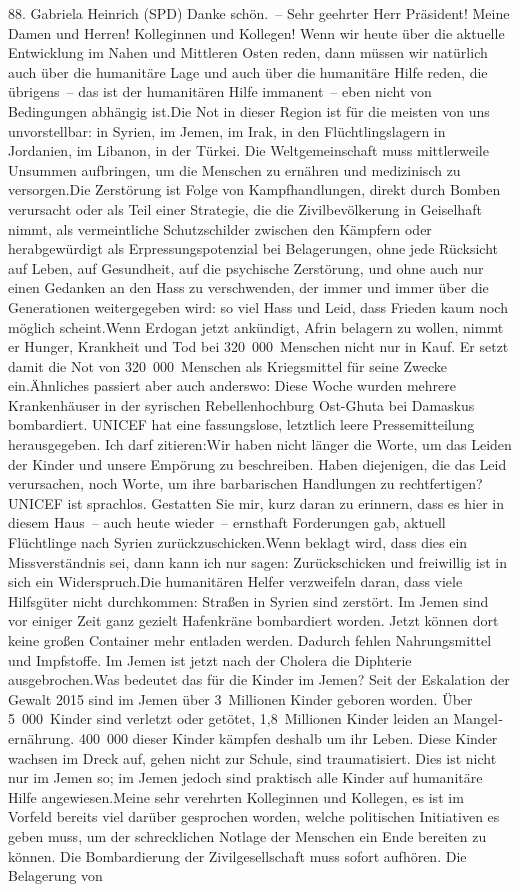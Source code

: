 \documentclass{article}
\begin{document}
	88. Gabriela Heinrich (SPD) Danke schön. – Sehr geehrter Herr Präsident! Meine Damen und Herren! Kolleginnen und Kollegen! Wenn wir heute über die aktuelle Entwicklung im Nahen und Mittleren Osten reden, dann müssen wir natürlich auch über die humanitäre Lage und auch über die humanitäre Hilfe reden, die übrigens – das ist der humanitären Hilfe immanent – eben nicht von Bedingungen abhängig ist.Die Not in dieser Region ist für die meisten von uns unvorstellbar: in Syrien, im Jemen, im Irak, in den Flüchtlingslagern in Jordanien, im Libanon, in der Türkei. Die Weltgemeinschaft muss mittlerweile Unsummen aufbringen, um die Menschen zu ernähren und medizinisch zu versorgen.Die Zerstörung ist Folge von Kampfhandlungen, direkt durch Bomben verursacht oder als Teil einer Strategie, die die Zivilbevölkerung in Geiselhaft nimmt, als vermeintliche Schutzschilder zwischen den Kämpfern oder herabgewürdigt als Erpressungspotenzial bei Belagerungen, ohne jede Rücksicht auf Leben, auf Gesundheit, auf die psychische Zerstörung, und ohne auch nur einen Gedanken an den Hass zu verschwenden, der immer und immer über die Generationen weitergegeben wird: so viel Hass und Leid, dass Frieden kaum noch möglich scheint.Wenn Erdogan jetzt ankündigt, Afrin belagern zu wollen, nimmt er Hunger, Krankheit und Tod bei 320 000 Menschen nicht nur in Kauf. Er setzt damit die Not von 320 000 Menschen als Kriegsmittel für seine Zwecke ein.Ähnliches passiert aber auch anderswo: Diese Woche wurden mehrere Krankenhäuser in der syrischen Rebellenhochburg Ost-Ghuta bei Damaskus bombardiert. UNICEF hat eine fassungslose, letztlich leere Pressemitteilung herausgegeben. Ich darf zitieren:Wir haben nicht länger die Worte, um das Leiden der Kinder und unsere Empörung zu beschreiben. Haben diejenigen, die das Leid verursachen, noch Worte, um ihre barbarischen Handlungen zu rechtfertigen?UNICEF ist sprachlos. Gestatten Sie mir, kurz daran zu erinnern, dass es hier in diesem Haus – auch heute wieder – ernsthaft Forderungen gab, aktuell Flüchtlinge nach Syrien zurückzuschicken.Wenn beklagt wird, dass dies ein Missverständnis sei, dann kann ich nur sagen: Zurückschicken und freiwillig ist in sich ein Widerspruch.Die humanitären Helfer verzweifeln daran, dass viele Hilfsgüter nicht durchkommen: Straßen in Syrien sind zerstört. Im Jemen sind vor einiger Zeit ganz gezielt Hafenkräne bombardiert worden. Jetzt können dort keine großen Container mehr entladen werden. Dadurch fehlen Nahrungsmittel und Impfstoffe. Im Jemen ist jetzt nach der Cholera die Diphterie ausgebrochen.Was bedeutet das für die Kinder im Jemen? Seit der Eskalation der Gewalt 2015 sind im Jemen über 3 Millionen Kinder geboren worden. Über 5 000 Kinder sind verletzt oder getötet, 1,8 Millionen Kinder leiden an Mangel­ernährung. 400 000 dieser Kinder kämpfen deshalb um ihr Leben. Diese Kinder wachsen im Dreck auf, gehen nicht zur Schule, sind traumatisiert. Dies ist nicht nur im Jemen so; im Jemen jedoch sind praktisch alle Kinder auf humanitäre Hilfe angewiesen.Meine sehr verehrten Kolleginnen und Kollegen, es ist im Vorfeld bereits viel darüber gesprochen worden, welche politischen Initiativen es geben muss, um der schrecklichen Notlage der Menschen ein Ende bereiten zu können. Die Bombardierung der Zivilgesellschaft muss sofort aufhören. Die Belagerung von 
\end{document}
